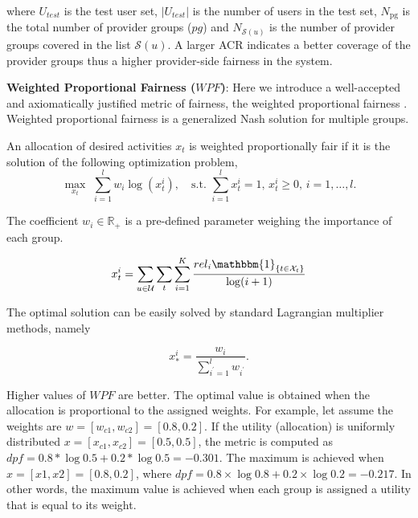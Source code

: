         where $U_{test}$ is the test user set, $|U_{test}|$ is the number of users in the test set, $N_\text{pg}$ is the total number of provider groups ($pg$) and $N_{\mathcal{S}(u)}$ is the number of provider groups covered in the list $\mathcal{S}(u)$. A larger ACR indicates a better coverage of the provider groups thus a higher provider-side fairness in the system.
        
        
        \textbf{Weighted Proportional Fairness ($WPF$)}: Here we introduce a well-accepted and axiomatically justified metric of fairness, the weighted proportional fairness \cite{kelly1998rate}. Weighted proportional fairness is a generalized Nash solution for multiple groups.
        
        \begin{definition}
        An allocation of desired activities $x_t$ is weighted proportionally fair if it is the solution of the following optimization problem,
        \begin{equation}\label{eq:fairness}
            \max_{x_t}\,\, \sum_{i=1}^lw_i\log(x^i_t), \quad\text{s.t.}\,\,\sum_{i=1}^lx^i_t = 1,\, x^i_t\geq0,\,i=1,\ldots,l.
        \end{equation}
        \end{definition}
        
        The coefficient $w_i\in\mathbb R_+$ is a pre-defined parameter weighing the importance of each group.
        
        
        \begin{equation*}
        x_{t}^i=\sum_{u\in\mathcal U}\sum_{t}\sum_{i=1}^K\frac{{rel}_i\mathbbm{1}_{\{t\in \mathcal X_{t}\}}}{\log(i+1)}
        \end{equation*}
        
        
        The optimal solution can be easily solved by standard Lagrangian multiplier methods, namely
        
        \begin{equation}
        x_*^i=\frac{w_i}{\sum_{i^{'}=1}^lw_{i^{'}}}.
        \end{equation}
        
        Higher values of $WPF$ are better. The optimal value is obtained when the allocation is proportional to the assigned weights. For example, let assume the weights are $w = [w_{c1}, w_{c2}] = [0.8, 0.2]$. If the utility (allocation) is uniformly distributed $x = [x_{c1}, x_{c2}] = [0.5,0.5]$, the metric is computed as $dpf = 0.8*\log 0.5+0.2*\log 0.5=-0.301$. The maximum is achieved when $x = [x1, x2] = [0.8, 0.2]$, where $dpf=0.8\times \log 0.8 + 0.2\times \log 0.2 = -0.217 $. In other words, the maximum value is achieved when each group is assigned a utility that is equal to its weight.
        
